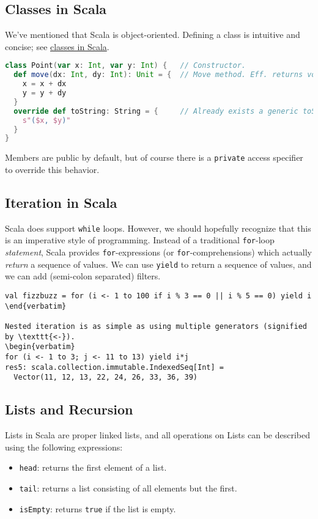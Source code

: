\documentclass[12pt,letterpaper,twoside]{article}
\begin{document}
\subsection{Classes in Scala} We've mentioned that Scala is object-oriented.
Defining a class is intuitive and concise; see \href{https://docs.scala-lang.org/tour/classes.html}{classes in Scala}.

\begin{lstlisting}[language=Scala]
class Point(var x: Int, var y: Int) {   // Constructor.
  def move(dx: Int, dy: Int): Unit = {  // Move method. Eff. returns void.
    x = x + dx
    y = y + dy
  }
  override def toString: String = {     // Already exists a generic toString...
    s"($x, $y)"
  }
}
\end{lstlisting}
Members are public by default, but of course there is a \texttt{private} access
specifier to override this behavior.

\subsection{Iteration in Scala} Scala does support \texttt{while} loops. However, we should hopefully recognize that this is an imperative style of programming.
Instead of a traditional \texttt{for}-loop \emph{statement}, Scala provides
\texttt{for}-expressions (or \texttt{for}-comprehensions) which actually
\emph{return} a sequence of values. We can use \texttt{yield} to
return a sequence of values, and we can add (semi-colon separated) filters.

\begin{verbatim}
val fizzbuzz = for (i <- 1 to 100 if i % 3 == 0 || i % 5 == 0) yield i \end{verbatim}

Nested iteration is as simple as using multiple generators (signified by \texttt{<-}).
\begin{verbatim}
for (i <- 1 to 3; j <- 11 to 13) yield i*j
res5: scala.collection.immutable.IndexedSeq[Int] = 
  Vector(11, 12, 13, 22, 24, 26, 33, 36, 39) 
\end{verbatim} 

\subsection{Lists and Recursion}
Lists in Scala are proper linked lists, and all operations on Lists can
be described using the following expressions:
\begin{itemize}   \item \texttt{head}: returns the first element of a list.
  \item \texttt{tail}: returns a list consisting of all elements but the first.
  \item \texttt{isEmpty}: returns \texttt{true} if the list is empty. \end{itemize}
\end{document}
